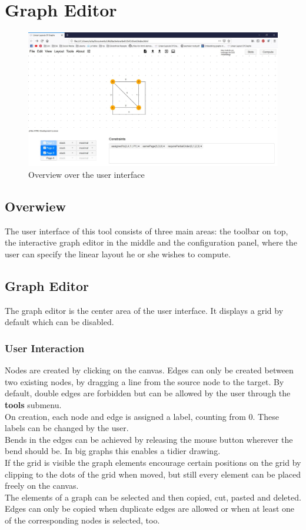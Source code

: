 \section{Graph Editor}
\begin{figure}[!h]
\begin{center}
\includegraphics[width=1\textwidth]{figures/figIndex/overviewIndex.jpg}
\caption{Overview over the user interface}
\label{img:overviewIndex}
\end{center}
\end{figure}
\subsection{Overwiew}
The user interface of this tool consists of three main areas: the toolbar on top, the interactive graph editor in the middle and the configuration panel, where the user can specify the linear layout he or she wishes to compute.\\
\subsection{Graph Editor}
The graph editor is the center area of the user interface. It displays a grid by default which can be disabled.\\
\subsubsection{User Interaction}
Nodes are created by clicking on the canvas. Edges can only be created between two existing nodes, by dragging a line from the source node to the target. By default, double edges are forbidden but can be allowed by the user through the \textbf{tools} submenu.\\
On creation, each node and edge is assigned a label, counting from 0. These labels can be changed by the user.\\
Bends in the edges can be achieved by releasing the mouse button wherever the bend should be. In big graphs this enables a tidier drawing.\\
If the grid is visible the graph elements encourage certain positions on the grid by clipping to the dots of the grid when moved, but still every element can be placed freely on the canvas.\\
The elements of a graph can be selected and then copied, cut, pasted and deleted. Edges can only be copied when duplicate edges are allowed or when at least one of the corresponding nodes is selected, too.\\
